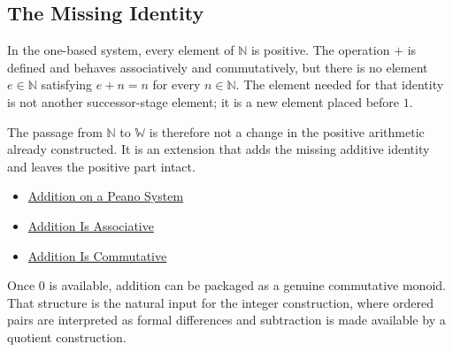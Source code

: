 \subsection*{The Missing Identity}

\begin{remark*}[Exposition]
In the one-based system, every element of $\mathbb{N}$ is positive. The
operation $+$ is defined and behaves associatively and commutatively, but
there is no element $e\in\mathbb{N}$ satisfying $e+n=n$ for every
$n\in\mathbb{N}$. The element needed for that identity is not another
successor-stage element; it is a new element placed before $1$.
\end{remark*}

\begin{remark*}[Interpretation]
The passage from $\mathbb{N}$ to $\mathbb{W}$ is therefore not a change in the
positive arithmetic already constructed. It is an extension that adds the
missing additive identity and leaves the positive part intact.
\end{remark*}

\begin{dependencies}
\begin{itemize}
  \item \hyperref[def:addition-on-peano-system]{Addition on a Peano System}
  \item \hyperref[thm:addition-associative]{Addition Is Associative}
  \item \hyperref[thm:addition-commutative]{Addition Is Commutative}
\end{itemize}
\end{dependencies}

\begin{remark*}[Exposition]
Once $0$ is available, addition can be packaged as a genuine commutative
monoid. That structure is the natural input for the integer construction,
where ordered pairs are interpreted as formal differences and subtraction is
made available by a quotient construction.
\end{remark*}
